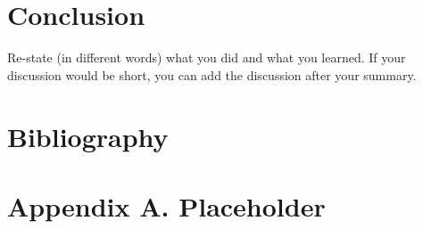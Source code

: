 \documentclass[12pt]{article}
\begin{document}
\section{Conclusion}
\label{sec:conclusion}

Re-state (in different words) what you did and what you learned. If your discussion would be short, you can add the discussion after your summary.

\newpage
\section*{Bibliography}
\singlespacing
\setlength\bibsep{0pt}


\newpage
\section*{Appendix A. Placeholder} \label{sec:appendixa}
\end{document}
